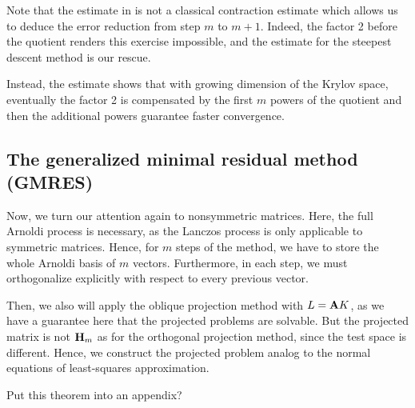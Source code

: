 \begin{remark}
  Note that the estimate in 
  is not a classical contraction estimate which allows us to deduce
  the error reduction from step $m$ to $m+1$. Indeed, the factor 2
  before the quotient renders this exercise impossible, and the
  estimate for the steepest descent method is our rescue.

  Instead, the estimate shows that with growing dimension of the
  Krylov space, eventually the factor 2 is compensated by the first
  $m$ powers of the quotient and then the additional powers guarantee
  faster convergence.
\end{remark}


\subsection{The generalized minimal residual method (GMRES)}

\begin{intro}
  Now, we turn our attention again to nonsymmetric matrices. Here, the
  full Arnoldi process is necessary, as the Lanczos process is only
  applicable to symmetric matrices. Hence, for $m$ steps of the
  method, we have to store the whole Arnoldi basis of $m$
  vectors. Furthermore, in each step, we must orthogonalize explicitly
  with respect to every previous vector.

  Then, we also will apply the oblique projection method with
  $L=\mathbf A K$, as we have a guarantee here that the projected problems
  are solvable. But the projected matrix is not $\mathbf H_m$ as for the
  orthogonal projection method, since the test space is
  different. Hence, we construct the projected problem analog to the
  normal equations of least-squares approximation.
\end{intro}

\begin{todo}
  Put this theorem into an appendix?
\end{todo}

